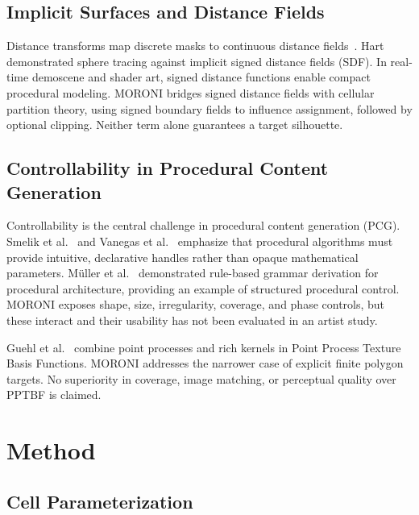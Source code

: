 \documentclass[sigconf,nonacm]{acmart}
\begin{document}
\subsection{Implicit Surfaces and Distance Fields}
Distance transforms map discrete masks to continuous distance
fields~\cite{felzenszwalb2004dt}. Hart~\cite{hart1996spheretracing} demonstrated
sphere tracing against implicit signed distance fields (SDF). In real-time
demoscene and shader art, signed distance functions enable compact procedural
modeling. MORONI bridges signed distance fields with cellular partition theory,
using signed boundary fields to influence assignment, followed by optional
clipping. Neither term alone guarantees a target silhouette.

\subsection{Controllability in Procedural Content Generation}
Controllability is the central challenge in procedural content generation (PCG).
Smelik et al.~\cite{smelik2014survey} and Vanegas et
al.~\cite{vanegas2010modelling} emphasize that procedural algorithms must provide
intuitive, declarative handles rather than opaque mathematical parameters.
M{\"u}ller et al.~\cite{muller2006buildings} demonstrated rule-based grammar
derivation for procedural architecture, providing an example of structured procedural control. MORONI exposes
shape, size, irregularity, coverage, and phase controls, but these interact
and their usability has not been evaluated in an artist study.

Guehl et al.~\cite{guehl2020pptbf} combine point processes and rich kernels
in Point Process Texture Basis Functions. MORONI addresses the narrower case
of explicit finite polygon targets. No superiority in coverage, image matching,
or perceptual quality over PPTBF is claimed.

\section{Method}
\label{sec:method}

\subsection{Cell Parameterization}
\end{document}
